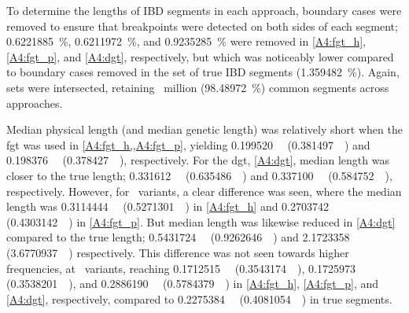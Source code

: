 To determine the lengths of IBD segments in each approach, boundary cases were removed to ensure that breakpoints were detected on both sides of each segment; \SI{0.6221885}{\percent}, \SI{0.6211972}{\percent}, and \SI{0.9235285}{\percent} were removed in \ref{A4:fgt_h}, \ref{A4:fgt_p}, and \ref{A4:dgt}, respectively, but which was noticeably lower compared to boundary cases removed in the set of true IBD segments (\SI{1.359482}{\percent}).
Again, sets were intersected, retaining ~million (\SI{98.48972}{\percent}) common segments across approaches.

%

%

Median physical length (and median genetic length) was relatively short when the \gls{fgt} was used in \cref{A4:fgt_h,,A4:fgt_p}, yielding \SI{0.199520}{\mega\basepair} (\SI{0.381497}{\centi\morgan}) and \SI{0.198376}{\mega\basepair} (\SI{0.378427}{\centi\morgan}), respectively.
For the \gls{dgt}, \cref{A4:dgt}, median length was closer to the true length; \SI{0.331612}{\mega\basepair} (\SI{0.635486}{\centi\morgan}) and \SI{0.337100}{\mega\basepair} (\SI{0.584752}{\centi\morgan}), respectively.
However, for ~variants, a clear difference was seen, where the median length was
\SI{0.3114444}{\mega\basepair} (\SI{0.5271301}{\centi\morgan}) in \ref{A4:fgt_h} and
\SI{0.2703742}{\mega\basepair} (\SI{0.4303142}{\centi\morgan}) in \ref{A4:fgt_p}.
But median length was likewise reduced in \ref{A4:dgt} compared to the true length; \SI{0.5431724}{\mega\basepair} (\SI{0.9262646}{\centi\morgan}) and
\SI{2.1723358}{\mega\basepair} (\SI{3.6770937}{\centi\morgan}) respectively.
This difference was not seen towards higher frequencies, \eg at ~variants, reaching
\SI{0.1712515}{\mega\basepair} (\SI{0.3543174}{\centi\morgan}),
\SI{0.1725973}{\mega\basepair} (\SI{0.3538201}{\centi\morgan}), and
\SI{0.2886190}{\mega\basepair} (\SI{0.5784379}{\centi\morgan}) in
\ref{A4:fgt_h}, \ref{A4:fgt_p}, and \ref{A4:dgt}, respectively, compared to
\SI{0.2275384}{\mega\basepair} (\SI{0.4081054}{\centi\morgan}) in true segments.

%

%

